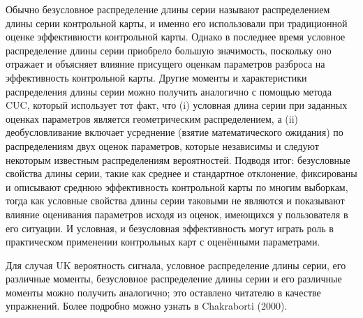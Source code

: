Обычно безусловное распределение длины серии называют распределением длины серии контрольной карты, и именно его использовали при традиционной оценке эффективности контрольной карты. Однако в последнее время условное распределение длины серии приобрело большую значимость, поскольку оно отражает и объясняет влияние присущего оценкам параметров разброса на эффективность контрольной карты. Другие моменты и характеристики распределения длины серии можно получить аналогично с помощью метода CUC, который использует тот факт, что (i) условная длина серии при заданных оценках параметров является геометрическим распределением, а (ii) деобусловливание включает усреднение (взятие математического ожидания) по распределениям двух оценок параметров, которые независимы и следуют некоторым известным распределениям вероятностей. Подводя итог: безусловные свойства длины серии, такие как среднее и стандартное отклонение, фиксированы и описывают среднюю эффективность контрольной карты по многим выборкам, тогда как условные свойства длины серии таковыми не являются и показывают влияние оценивания параметров исходя из оценок, имеющихся у пользователя в его ситуации. И условная, и безусловная эффективность могут играть роль в практическом применении контрольных карт с оценёнными параметрами.

Для случая UK вероятность сигнала, условное распределение длины серии, его различные моменты, безусловное распределение длины серии и его различные моменты можно получить аналогично; это оставлено читателю в качестве упражнений. Более подробно можно узнать в Chakraborti (2000).

